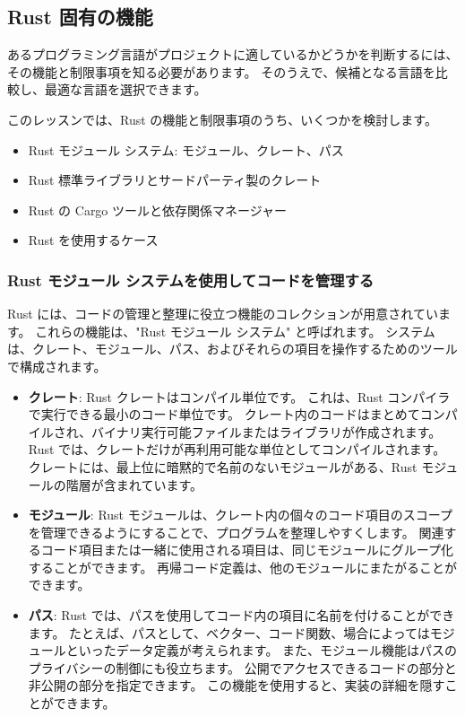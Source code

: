 \subsection{Rust 固有の機能}

あるプログラミング言語がプロジェクトに適しているかどうかを判断するには、その機能と制限事項を知る必要があります。 そのうえで、候補となる言語を比較し、最適な言語を選択できます。

このレッスンでは、Rust の機能と制限事項のうち、いくつかを検討します。

\begin{itemize}
\item Rust モジュール システム: モジュール、クレート、パス
\item Rust 標準ライブラリとサードパーティ製のクレート
\item Rust の Cargo ツールと依存関係マネージャー
\item Rust を使用するケース
\end{itemize}

\subsubsection{Rust モジュール システムを使用してコードを管理する}

Rust には、コードの管理と整理に役立つ機能のコレクションが用意されています。 これらの機能は、"Rust モジュール システム" と呼ばれます。 システムは、クレート、モジュール、パス、およびそれらの項目を操作するためのツールで構成されます。

\begin{itemize}
\item \textbf{クレート}: Rust クレートはコンパイル単位です。 これは、Rust コンパイラで実行できる最小のコード単位です。 クレート内のコードはまとめてコンパイルされ、バイナリ実行可能ファイルまたはライブラリが作成されます。 Rust では、クレートだけが再利用可能な単位としてコンパイルされます。 クレートには、最上位に暗黙的で名前のないモジュールがある、Rust モジュールの階層が含まれています。

\item \textbf{モジュール}: Rust モジュールは、クレート内の個々のコード項目のスコープを管理できるようにすることで、プログラムを整理しやすくします。 関連するコード項目または一緒に使用される項目は、同じモジュールにグループ化することができます。 再帰コード定義は、他のモジュールにまたがることができます。

\item \textbf{パス}: Rust では、パスを使用してコード内の項目に名前を付けることができます。 たとえば、パスとして、ベクター、コード関数、場合によってはモジュールといったデータ定義が考えられます。 また、モジュール機能はパスのプライバシーの制御にも役立ちます。 公開でアクセスできるコードの部分と非公開の部分を指定できます。 この機能を使用すると、実装の詳細を隠すことができます。
\end{itemize}

